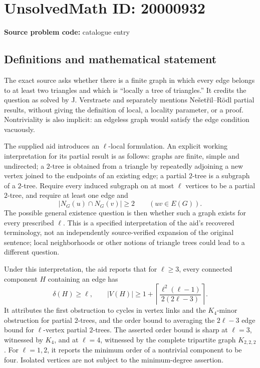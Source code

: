 \documentclass[11pt]{article}
\begin{document}
\section*{UnsolvedMath ID: 20000932}
\textbf{Source problem code:} catalogue entry
\subsection{Definitions and mathematical statement}
The exact source asks whether there is a finite graph in which every edge belongs to at least two triangles and which is ``locally a tree of triangles.'' It credits the question as solved by J. Verstraete and separately mentions Ne\v{s}et\v{r}il--R\"odl partial results, without giving the definition of local, a locality parameter, or a proof. Nontriviality is also implicit: an edgeless graph would satisfy the edge condition vacuously.

The supplied aid introduces an \(\ell\)-local formulation. An explicit working interpretation for its partial result is as follows: graphs are finite, simple and undirected; a \(2\)-tree is obtained from a triangle by repeatedly adjoining a new vertex joined to the endpoints of an existing edge; a partial \(2\)-tree is a subgraph of a \(2\)-tree. Require every induced subgraph on at most \(\ell\) vertices to be a partial \(2\)-tree, and require at least one edge and
\[
 |N_G(u)\cap N_G(v)|\ge2\qquad(uv\in E(G)).
\]
The possible general existence question is then whether such a graph exists for every prescribed \(\ell\). This is a specified interpretation of the aid's recovered terminology, not an independently source-verified expansion of the original sentence; local neighborhoods or other notions of triangle trees could lead to a different question.

Under this interpretation, the aid reports that for \(\ell\ge3\), every connected component \(H\) containing an edge has
\[
 \delta(H)\ge\ell,
 \qquad
 |V(H)|\ge1+\left\lceil
 \frac{\ell^2(\ell-1)}{2(2\ell-3)}\right\rceil.
\]
It attributes the first obstruction to cycles in vertex links and the \(K_4\)-minor obstruction for partial \(2\)-trees, and the order bound to averaging the \(2\ell-3\) edge bound for \(\ell\)-vertex partial \(2\)-trees. The asserted order bound is sharp at \(\ell=3\), witnessed by \(K_4\), and at \(\ell=4\), witnessed by the complete tripartite graph \(K_{2,2,2}\). For \(\ell=1,2\), it reports the minimum order of a nontrivial component to be four. Isolated vertices are not subject to the minimum-degree assertion.
\end{document}

